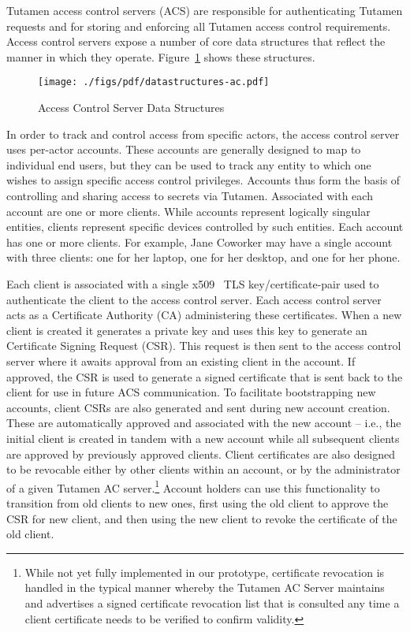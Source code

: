 Tutamen access control servers (ACS) are responsible for
authenticating Tutamen requests and for storing and enforcing all
Tutamen access control requirements. Access control servers expose a
number of core data structures that reflect the manner in which they
operate. Figure~\ref{fig:tutamen:acstructs} shows these structures.

\begin{figure}[thb]
  \centering
  \texttt{[image: ./figs/pdf/datastructures-ac.pdf]}
  \caption{Access Control Server Data Structures}
  \label{fig:tutamen:acstructs}
\end{figure}

In order to track and control access from specific actors, the access
control server uses per-actor accounts. These accounts are generally
designed to map to individual end users, but they can be used to track
any entity to which one wishes to assign specific access control
privileges. Accounts thus form the basis of controlling and sharing
access to secrets via Tutamen. Associated with each account are one or
more clients. While accounts represent logically singular entities,
clients represent specific devices controlled by such entities. Each
account has one or more clients. For example, Jane Coworker may have a
single account with three clients: one for her laptop, one for her
desktop, and one for her phone.

Each client is associated with a single x509~\cite{rfc5280} TLS
key/certificate-pair used to authenticate the client to the access
control server. Each access control server acts as a Certificate
Authority (CA) administering these certificates. When a new client is
created it generates a private key and uses this key to generate an
Certificate Signing Request (CSR). This request is then sent to the
access control server where it awaits approval from an existing client
in the account. If approved, the CSR is used to generate a signed
certificate that is sent back to the client for use in future ACS
communication. To facilitate bootstrapping new accounts, client CSRs
are also generated and sent during new account creation. These are
automatically approved and associated with the new account -- i.e.,
the initial client is created in tandem with a new account while all
subsequent clients are approved by previously approved clients. Client
certificates are also designed to be revocable either by other clients
within an account, or by the administrator of a given Tutamen AC
server.\footnote{While not yet fully implemented in our prototype,
  certificate revocation is handled in the typical manner whereby the
  Tutamen AC Server maintains and advertises a signed certificate
  revocation list that is consulted any time a client certificate
  needs to be verified to confirm validity.} Account holders can use
this functionality to transition from old clients to new ones, first
using the old client to approve the CSR for new client, and then using
the new client to revoke the certificate of the old client.

